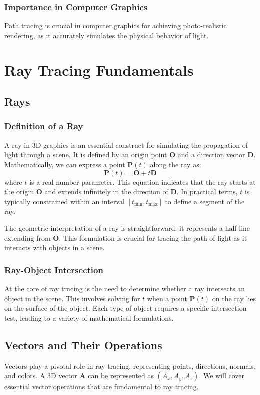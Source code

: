 \documentclass[12pt]{article}
\begin{document}
\subsubsection{Importance in Computer Graphics}
Path tracing is crucial in computer graphics for achieving photo-realistic rendering, as it accurately simulates the physical behavior of light.

\section{Ray Tracing Fundamentals}
\label{sec:fundamentals}

\subsection{Rays}
\subsubsection{Definition of a Ray}
A ray in 3D graphics is an essential construct for simulating the propagation of light through a scene. It is defined by an origin point \(\mathbf{O}\) and a direction vector \(\mathbf{D}\). Mathematically, we can express a point \(\mathbf{P}(t)\) along the ray as:
\[
    \mathbf{P}(t) = \mathbf{O} + t\mathbf{D}
\]
where \(t\) is a real number parameter. This equation indicates that the ray starts at the origin \(\mathbf{O}\) and extends infinitely in the direction of \(\mathbf{D}\). In practical terms, \(t\) is typically constrained within an interval \([t_{\text{min}}, t_{\text{max}}]\) to define a segment of the ray.

The geometric interpretation of a ray is straightforward: it represents a half-line extending from \(\mathbf{O}\). This formulation is crucial for tracing the path of light as it interacts with objects in a scene.

\subsubsection{Ray-Object Intersection}
At the core of ray tracing is the need to determine whether a ray intersects an object in the scene. This involves solving for \(t\) when a point \(\mathbf{P}(t)\) on the ray lies on the surface of the object. Each type of object requires a specific intersection test, leading to a variety of mathematical formulations.

\subsection{Vectors and Their Operations}
Vectors play a pivotal role in ray tracing, representing points, directions, normals, and colors. A 3D vector \(\mathbf{A}\) can be represented as \((A_x, A_y, A_z)\). We will cover essential vector operations that are fundamental to ray tracing.
\end{document}
